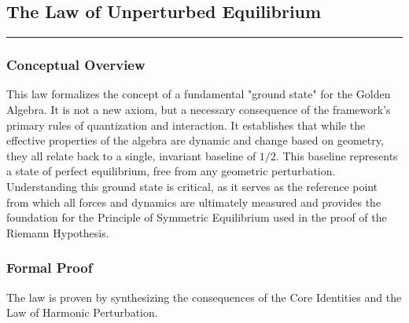 \subsection*{The Law of Unperturbed Equilibrium}
\hrule
\vspace{0.3cm}
\vspace{0.5cm}

\subsubsection*{Conceptual Overview}
This law formalizes the concept of a fundamental "ground state" for the Golden Algebra. It is not a new axiom, but a necessary consequence of the framework's primary rules of quantization and interaction. It establishes that while the effective properties of the algebra are dynamic and change based on geometry, they all relate back to a single, invariant baseline of $1/2$. This baseline represents a state of perfect equilibrium, free from any geometric perturbation. Understanding this ground state is critical, as it serves as the reference point from which all forces and dynamics are ultimately measured and provides the foundation for the Principle of Symmetric Equilibrium used in the proof of the Riemann Hypothesis.

\subsubsection*{Formal Proof}
The law is proven by synthesizing the consequences of the Core Identities and the Law of Harmonic Perturbation.


